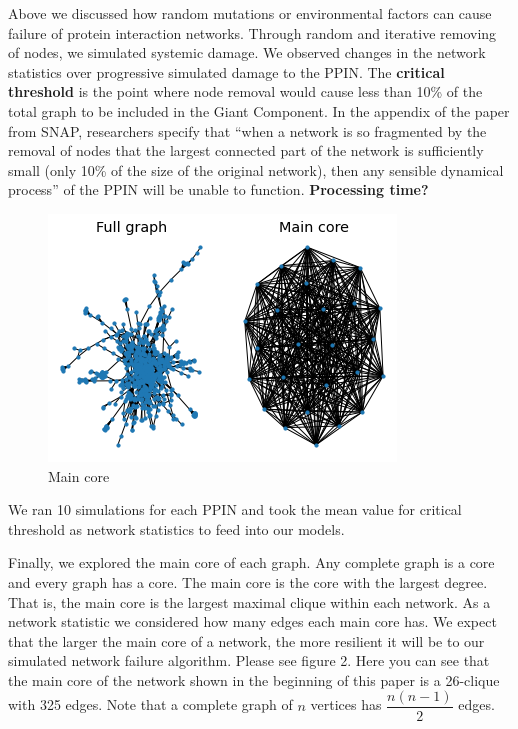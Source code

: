 \documentclass[12pt]{article}
\begin{document}
Above we discussed how random mutations or environmental factors can cause failure of protein interaction networks. Through random and iterative removing of nodes, we simulated systemic damage. We observed changes in the network statistics over progressive simulated damage to the PPIN. The \textbf{critical threshold} is the point where node removal would cause less than 10\% of the total graph to be included in the Giant Component. In the appendix of the paper from SNAP, researchers specify that ``when a network is so fragmented by the removal of nodes that the largest connected part of the network is sufficiently small (only 10\% of the size of the original network), then any sensible dynamical process'' of the PPIN will be unable to function. \textbf{Processing time?} \begin{figure}
\centering
  \includegraphics[width=.4\linewidth]{PPIN_fig7}
  \caption{Main core}
  \label{fig:PPIN_fig7}
\end{figure}  We ran 10 simulations for each PPIN and took the mean value for critical threshold as network statistics to feed into our models.

Finally, we explored the main core of each graph. Any complete graph is a core and every graph has a core. The main core is the core with the largest degree. That is, the main core is the largest maximal clique within each network. As a network statistic we considered how many edges each main core has. We expect that the larger the main core of a network, the more resilient it will be to our simulated network failure algorithm. Please see figure 2. Here you can see that the main core of the network shown in the beginning of this paper is a 26-clique with 325 edges. Note that a complete graph of $n$ vertices has $\dfrac{n(n-1)}{2}$ edges. 
\end{document}
